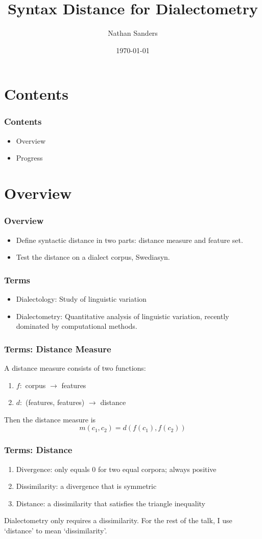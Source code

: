 \documentclass{beamer}
\title{Syntax Distance for Dialectometry}
\author{Nathan Sanders}
\date{\today}
\begin{document}
\frame{\titlepage}
\section{Contents}
\begin{frame}
  \frametitle{Contents}
  \begin{itemize}
 \item Overview
  \item Progress
\end{itemize}
\end{frame}

\section{Overview}
\begin{frame}
  \frametitle{Overview}
  \begin{itemize}
 \item Define syntactic distance in two parts: distance measure and
   feature set.
 \item Test the distance on a dialect corpus, Swediasyn.
\end{itemize}
\end{frame}

\begin{frame}
  \frametitle{Terms}
  \begin{itemize}
  \item Dialectology: Study of linguistic variation
  \item Dialectometry: Quantitative analysis of linguistic variation,
    recently dominated by computational methods.
 \end{itemize}
\end{frame}

\begin{frame}
  \frametitle{Terms: Distance Measure}
  A distance measure consists of two functions:
  \begin{enumerate}
  \item $f : $ corpus $\to$ features
  \item $d : $ (features, features) $\to$ distance
  \end{enumerate}
  Then the distance measure is
 \[ m(c_1,c_2) = d(f(c_1), f(c_2)) \]
\end{frame}

\begin{frame}
  \frametitle{Terms: Distance}
  \begin{enumerate}
  \item Divergence: only equals 0 for two equal corpora; always
    positive
  \item Dissimilarity: a divergence that is symmetric
  \item Distance: a dissimilarity that satisfies the triangle
    inequality
  \end{enumerate}
  Dialectometry only requires a dissimilarity. For the rest of the talk,
  I use `distance' to mean `dissimilarity'.
\end{frame}
\end{document}
